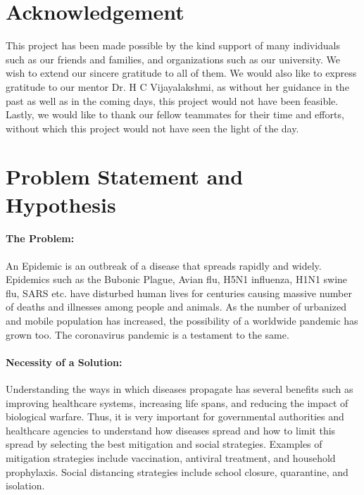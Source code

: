 \documentclass[14pt, a4paper]{extarticle}
\begin{document}
    \newpage
    \thispagestyle{empty}
    \section*{Acknowledgement}
        This project has been made possible by the kind support of many individuals such as our friends and families, and organizations such as our university. We wish to extend our sincere gratitude to all of them. We would also like to express gratitude to our mentor Dr. H C Vijayalakshmi, as without her guidance in the past as well as in the coming days, this project would not have been feasible. Lastly, we would like to thank our fellow teammates for their time and efforts, without which this project would not have seen the light of the day.

	\newpage
	\thispagestyle{empty}
	\tableofcontents

	\newpage
	\section{Problem Statement and Hypothesis}
	    \paragraph{The Problem:} An Epidemic is an outbreak of a disease that spreads rapidly and widely. Epidemics such as the Bubonic Plague, Avian flu, H5N1 influenza, H1N1 swine flu, SARS etc. have disturbed human lives for centuries causing massive number of deaths and illnesses among people and animals. As the number of urbanized and mobile population has increased, the possibility of a worldwide pandemic has grown too. The coronavirus pandemic is a testament to the same. 

        \paragraph{Necessity of a Solution:} Understanding the ways in which diseases propagate has several benefits such as improving healthcare systems, increasing life spans, and reducing the impact of biological warfare. Thus, it is very important for governmental authorities and healthcare agencies to understand how diseases spread and how to limit this spread by selecting the best mitigation and social strategies. Examples of mitigation strategies include vaccination, antiviral treatment, and household prophylaxis. Social distancing strategies include school closure, quarantine, and isolation.
\end{document}
